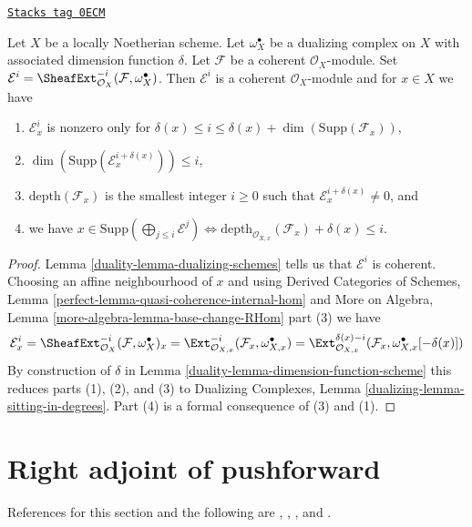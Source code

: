 \begin{lemma}
\label{duality-lemma-sitting-in-degrees}
\href{https://stacks.math.columbia.edu/tag/0ECM}{\texttt{Stacks tag 0ECM}}

Let $X$ be a locally Noetherian scheme. Let $\omega_X^\bullet$
be a dualizing complex on $X$ with associated dimension function $\delta$.
Let $\mathcal{F}$ be a coherent $\mathcal{O}_X$-module. Set
$\mathcal{E}^i = \SheafExt^{-i}_{\mathcal{O}_X}(\mathcal{F}, \omega_X^\bullet)$.
Then $\mathcal{E}^i$ is a coherent $\mathcal{O}_X$-module and
for $x \in X$ we have
\begin{enumerate}
\item $\mathcal{E}^i_x$ is nonzero only for
$\delta(x) \leq i \leq \delta(x) + \dim(\text{Supp}(\mathcal{F}_x))$,
\item $\dim(\text{Supp}(\mathcal{E}^{i + \delta(x)}_x)) \leq i$,
\item $\text{depth}(\mathcal{F}_x)$ is the smallest integer
$i \geq 0$ such that $\mathcal{E}_x^{i + \delta(x)} \not = 0$, and
\item we have
$x \in \text{Supp}(\bigoplus_{j \leq i} \mathcal{E}^j)
\Leftrightarrow
\text{depth}_{\mathcal{O}_{X, x}}(\mathcal{F}_x) + \delta(x) \leq i$.
\end{enumerate}
\end{lemma}

\begin{proof}

Lemma \ref{duality-lemma-dualizing-schemes} tells us that $\mathcal{E}^i$
is coherent. Choosing an affine neighbourhood of $x$ and using
Derived Categories of Schemes, Lemma
\ref{perfect-lemma-quasi-coherence-internal-hom}
and
More on Algebra, Lemma
\ref{more-algebra-lemma-base-change-RHom} part (3)
we have
$$
\mathcal{E}^i_x =
\SheafExt^{-i}_{\mathcal{O}_X}(\mathcal{F}, \omega_X^\bullet)_x =
\Ext^{-i}_{\mathcal{O}_{X, x}}(\mathcal{F}_x,
\omega_{X, x}^\bullet) =
\Ext^{\delta(x) - i}_{\mathcal{O}_{X, x}}(\mathcal{F}_x,
\omega_{X, x}^\bullet[-\delta(x)])
$$
By construction of $\delta$ in Lemma \ref{duality-lemma-dimension-function-scheme}
this reduces parts (1), (2), and (3) to
Dualizing Complexes, Lemma \ref{dualizing-lemma-sitting-in-degrees}.
Part (4) is a formal consequence of (3) and (1).
\end{proof}

\section{Right adjoint of pushforward}
\label{duality-section-twisted-inverse-image}
References for this section and the following are
\cite{Neeman-Grothendieck}, \cite{LN},
\cite{Lipman-notes}, and \cite{Neeman-improvement}.

